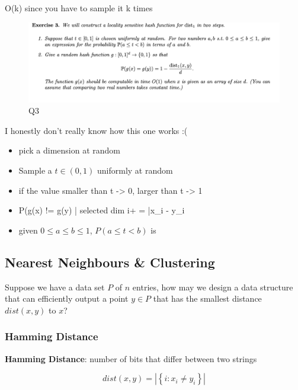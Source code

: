 \documentclass[../notes.tex]{subfiles}
\begin{document}
O(k) since you have to sample it k times



\begin{figure}[H]
    \centering
    \includegraphics[width=0.8\linewidth]{img/image_2023-01-25-12-39-25.png}
    \caption{Q3}
\end{figure}

\begin{blockquote}
    I honestly don't really know how this one works :(
\end{blockquote}


\begin{itemize}
    \item pick a dimension at random
    \item Sample a $ t \in (0, 1) $ uniformly at random
    \item if the value smaller than t -> 0, larger than t -> 1
    \item P(g(x) != g(y) | selected dim i+ = |x\_i - y\_i
    \item given $ 0 \le  a \le  b \le  1 $, $ P(a \le  t < b) $  is 
\end{itemize}

\subsection{Nearest Neighbours \& Clustering}

Suppose we have a data set $ P $ of $ n $ entries, how may we design a data structure that can efficiently output a point $ y \in P $ that has the smallest distance $ dist(x,y) $ to $ x $?

\subsubsection{Hamming Distance}

\begin{definition}
    \textbf{Hamming Distance}: number of bits that differ between two strings

    \begin{equation}
        dist(x,y) = |\left\{ i : x_i \neq  y_i \right\} |
    \end{equation}


    
\end{definition}
\end{document}
